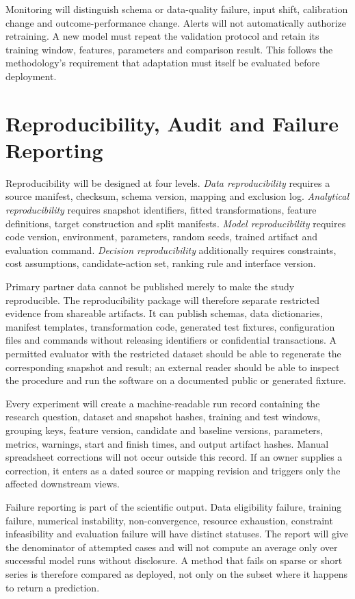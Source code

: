Monitoring will distinguish schema or data-quality failure, input shift,
calibration change and outcome-performance change. Alerts will not automatically
authorize retraining. A new model must repeat the validation protocol and retain
its training window, features, parameters and comparison result. This follows
the methodology's requirement that adaptation must itself be evaluated before
deployment.

\section{Reproducibility, Audit and Failure Reporting}

Reproducibility will be designed at four levels. \emph{Data reproducibility}
requires a source manifest, checksum, schema version, mapping and exclusion log.
\emph{Analytical reproducibility} requires snapshot identifiers, fitted
transformations, feature definitions, target construction and split manifests.
\emph{Model reproducibility} requires code version, environment, parameters,
random seeds, trained artifact and evaluation command. \emph{Decision
reproducibility} additionally requires constraints, cost assumptions,
candidate-action set, ranking rule and interface version.

Primary partner data cannot be published merely to make the study reproducible.
The reproducibility package will therefore separate restricted evidence from
shareable artifacts. It can publish schemas, data dictionaries, manifest
templates, transformation code, generated test fixtures, configuration files
and commands without releasing identifiers or confidential transactions. A
permitted evaluator with the restricted dataset should be able to regenerate
the corresponding snapshot and result; an external reader should be able to
inspect the procedure and run the software on a documented public or generated
fixture.

Every experiment will create a machine-readable run record containing the
research question, dataset and snapshot hashes, training and test windows,
grouping keys, feature version, candidate and baseline versions, parameters,
metrics, warnings, start and finish times, and output artifact hashes. Manual
spreadsheet corrections will not occur outside this record. If an owner supplies
a correction, it enters as a dated source or mapping revision and triggers only
the affected downstream views.

Failure reporting is part of the scientific output. Data eligibility failure,
training failure, numerical instability, non-convergence, resource exhaustion,
constraint infeasibility and evaluation failure will have distinct statuses.
The report will give the denominator of attempted cases and will not compute an
average only over successful model runs without disclosure. A method that fails
on sparse or short series is therefore compared as deployed, not only on the
subset where it happens to return a prediction.


